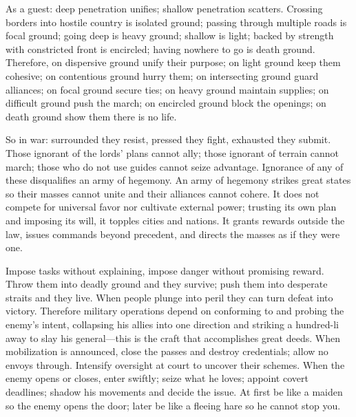 \documentclass[12pt]{book}
\begin{document}
{As a guest: deep penetration unifies; shallow penetration scatters. Crossing borders into hostile country is isolated ground; passing through multiple roads is focal ground; going deep is heavy ground; shallow is light; backed by strength with constricted front is encircled; having nowhere to go is death ground. Therefore, on dispersive ground unify their purpose; on light ground keep them cohesive; on contentious ground hurry them; on intersecting ground guard alliances; on focal ground secure ties; on heavy ground maintain supplies; on difficult ground push the march; on encircled ground block the openings; on death ground show them there is no life.

So in war: surrounded they resist, pressed they fight, exhausted they submit. Those ignorant of the lords’ plans cannot ally; those ignorant of terrain cannot march; those who do not use guides cannot seize advantage. Ignorance of any of these disqualifies an army of hegemony. An army of hegemony strikes great states so their masses cannot unite and their alliances cannot cohere. It does not compete for universal favor nor cultivate external power; trusting its own plan and imposing its will, it topples cities and nations. It grants rewards outside the law, issues commands beyond precedent, and directs the masses as if they were one.

Impose tasks without explaining, impose danger without promising reward. Throw them into deadly ground and they survive; push them into desperate straits and they live. When people plunge into peril they can turn defeat into victory. Therefore military operations depend on conforming to and probing the enemy’s intent, collapsing his allies into one direction and striking a hundred-li away to slay his general—this is the craft that accomplishes great deeds. When mobilization is announced, close the passes and destroy credentials; allow no envoys through. Intensify oversight at court to uncover their schemes. When the enemy opens or closes, enter swiftly; seize what he loves; appoint covert deadlines; shadow his movements and decide the issue. At first be like a maiden so the enemy opens the door; later be like a fleeing hare so he cannot stop you.}
\end{document}
